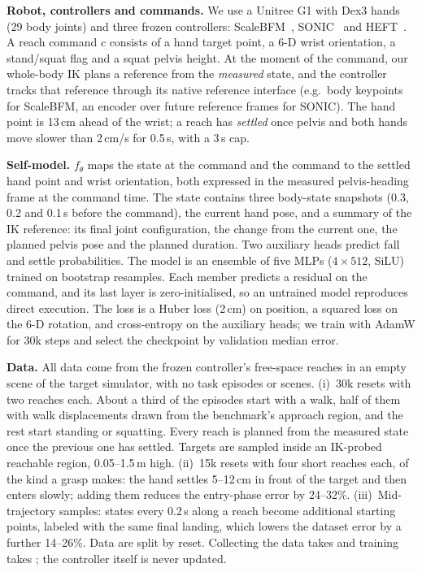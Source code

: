 \documentclass[conference]{IEEEtran}
\begin{document}
\textbf{Robot, controllers and commands.} We use a Unitree G1 with Dex3 hands (29 body joints) and three frozen controllers: ScaleBFM~\cite{scalebfm}, SONIC~\cite{sonic} and HEFT~\cite{heft}. A reach command $c$ consists of a hand target point, a 6-D wrist orientation, a stand/squat flag and a squat pelvis height. At the moment of the command, our whole-body IK plans a reference from the \emph{measured} state, and the controller tracks that reference through its native reference interface (e.g.\ body keypoints for ScaleBFM, an encoder over future reference frames for SONIC).
The hand point is 13\,cm ahead of the wrist; a reach has \emph{settled} once pelvis and both hands move slower than 2\,cm/s for 0.5\,s, with a 3\,s cap.

\textbf{Self-model.} $f_\theta$ maps the state at the command and the command to the settled hand point and wrist orientation, both expressed in the measured pelvis-heading frame at the command time. The state contains three body-state snapshots (0.3, 0.2 and 0.1\,s before the command), the current hand pose, and a summary of the IK reference: its final joint configuration, the change from the current one, the planned pelvis pose and the planned duration. Two auxiliary heads predict fall and settle probabilities. The model is an ensemble of five MLPs ($4\times512$, SiLU) trained on bootstrap resamples. Each member predicts a residual on the command, and its last layer is zero-initialised, so an untrained model reproduces direct execution. The loss is a Huber loss (2\,cm) on position, a squared loss on the 6-D rotation, and cross-entropy on the auxiliary heads; we train with AdamW for 30k steps and select the checkpoint by validation median error.

\textbf{Data.} All data come from the frozen controller's free-space reaches in an empty scene of the target simulator, with no task episodes or scenes. (i)~30k resets with two reaches each. About a third of the episodes start with a walk, half of them with walk displacements drawn from the benchmark's approach region, and the rest start standing or squatting. Every reach is planned from the measured state once the previous one has settled. Targets are sampled inside an IK-probed reachable region, 0.05--1.5\,m high. (ii)~15k resets with four short reaches each, of the kind a grasp makes: the hand settles 5--12\,cm in front of the target and then enters slowly; adding them reduces the entry-phase error by 24--32\%. (iii)~Mid-trajectory samples: states every 0.2\,s along a reach become additional starting points, labeled with the same final landing, which lowers the dataset error by a further 14--26\%. Data are split by reset. Collecting the data takes  and training takes ; the controller itself is never updated.
\end{document}

